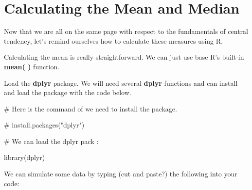 \documentclass[
  letterpaper,
  DIV=11,
  numbers=noendperiod]{scrreprt}
\newenvironment{Shaded}{\begin{snugshade}}{\end{snugshade}}
\newcommand{\CommentTok}[1]{\textcolor[rgb]{0.37,0.37,0.37}{#1}}
\newcommand{\FunctionTok}[1]{\textcolor[rgb]{0.28,0.35,0.67}{#1}}
\newcommand{\NormalTok}[1]{\textcolor[rgb]{0.00,0.23,0.31}{#1}}
\begin{document}
\section*{Calculating the Mean and
Median}\label{calculating-the-mean-and-median}


Now that we are all on the same page with respect to the fundamentals of
central tendency, let's remind ourselves how to calculate these measures
using R.

Calculating the mean is really straightforward. We can just use base R's
built-in \textbf{mean( )} function.

Load the \textbf{dplyr} package. We will need several \textbf{dplyr}
functions and can install and load the package with the code below.

\begin{Shaded}
\begin{Highlighting}[]
\CommentTok{\# Here is the command of we need to install the package. }

\CommentTok{\# install.packages("dplyr")}

\CommentTok{\# We can load the dplyr pack :}

\FunctionTok{library}\NormalTok{(dplyr)}
\end{Highlighting}
\end{Shaded}

We can simulate some data by typing (cut and paste?) the following into
your code:
\end{document}
